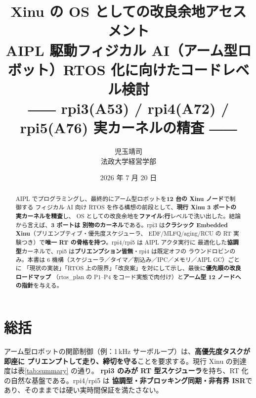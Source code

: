 \documentclass[11pt,a4paper]{article}
\title{\textbf{Xinu の OS としての改良余地アセスメント}\\[2mm]
  \large AIPL 駆動フィジカル AI（アーム型ロボット）RTOS 化に向けたコードレベル検討\\[1mm]
  \normalsize ―― rpi3(A53) / rpi4(A72) / rpi5(A76) 実カーネルの精査 ――}
\author{児玉靖司\\\small 法政大学経営学部}
\date{2026 年 7 月 20 日}
\begin{document}
\maketitle

\begin{abstract}
\noindent
AIPL でプログラミングし、最終的にアーム型ロボットを\textbf{12 台の Xinu ノード}で制御する
フィジカル AI 向け RTOS を作る構想の前段として、\textbf{現行 Xinu 3 ポートの実カーネルを精査}し、
OS としての改良余地を\textbf{ファイル:行}レベルで洗い出した。結論から言えば、\textbf{3 ポートは
別物のカーネル}である。rpi3 は\textbf{クラシック Embedded Xinu}（プリエンプティブ・優先度スケジューラ、
EDF/MLFQ/aging/RCU の RT 実験つき）で\textbf{唯一 RT の骨格を持つ}。rpi4/rpi5 は AIPL アクタ実行に
最適化した\textbf{協調型}カーネルで、rpi5 は\textbf{プリエンプション皆無}・rpi4 は既定オフの
ラウンドロビンのみ。本書は 6 機構（スケジューラ／タイマ／割込み／IPC／メモリ／AIPL GC）ごとに
「現状の実装」「RTOS 上の限界」「改良案」を対にして示し、最後に\textbf{優先順の改良ロードマップ}
（rtos\_plan の P1--P4 をコード実態で肉付け）と\textbf{アーム型 12 ノードへの指針}を与える。
\end{abstract}

\tableofcontents
\bigskip

\section{総括}
アーム型ロボットの関節制御（例：1\,kHz サーボループ）は、\textbf{高優先度タスクが即座に
プリエンプトして走り、締切を守る}ことを要求する。現行 Xinu の到達度は表\ref{tab:summary} の通り。
\textbf{rpi3 のみが RT 型スケジューラ}を持ち、RT 化の自然な基盤である。rpi4/rpi5 は
\textbf{協調型・非ブロッキング同期・非有界 ISR}であり、そのままでは硬い実時間保証を満たさない。
\end{document}
